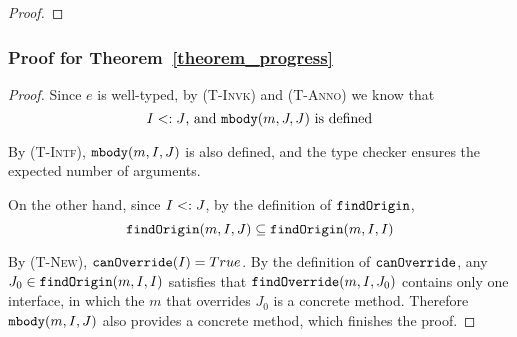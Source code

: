 \begin{proof}
\begin{comment}
\noindent \textbf{Case Super-Invk.}
let \[ e = \kwsuper.K::m(\overline{\angl{I_e}} \overline{e}) \]   
Suppose \[ \mbody(m, K, K) = (J', \overline{I_x} \; \overline{x}, I_{e_0} \; e_0) \] 
then \[ e' =  [\overline{\angl{I_x}} \overline{e}/\overline{x}] e_0 \] 
By rules \textsc{(T-New)} and \textsc{(T-Invk)}, 
  \[ 
     \mtype(m, K, K) = \overline{I_x} \rightarrow I_{e_0} \quad 
     \judgeewf \Gamma {\overline{e} : \overline{I_e'}} \quad
     \overline{I_e'} \subtype \overline{I_x} \quad
     \textit{, for some } \; \overline{I_e'}
  \]
By Lemma~\ref{lemma0},
    \[
    \judgeewf {\Gamma, \overline{x}:\overline{I_x}, \kwthis:J_0} {e_0:I_f} \textit{, for some } K \subtype J_0 \textit{ and } I_f \subtype I_{e_0}
    \]
By Lemma~\ref{lemma1},
    \[
    \judgeewf {\Gamma} {[\overline{\angl{I_x}} \overline{e}/\overline{x} ] e_0  :  I_g} \textit{, for some } I_g \subtype I_f 
    \]
So $I_g <: I_{e_0}$, finally just let $I' = I_g$.

\end{comment}
\end{proof}

\subsubsection{Proof for Theorem~\ref{theorem_progress}}
\begin{proof}
	
Since $e$ is well-typed, by \textsc{(T-Invk)} and \textsc{(T-Anno)} we know that
$$I <: J\textrm{, and }\texttt{mbody}(m, J, J) \textrm{ is defined}$$

By \textsc{(T-Intf)}, $\texttt{mbody}(m, I, J)$ is also defined, and the type checker ensures the expected number of arguments.

On the other hand, since $I <: J$, by the definition of $\texttt{findOrigin}$, $$\texttt{findOrigin}(m, I, J) \subseteq \texttt{findOrigin}(m, I, I)$$

By \textsc{(T-New)}, $\texttt{canOverride}(I) = True$. By the definition of $\texttt{canOverride}$, any $J_0\in\texttt{findOrigin}(m, I, I)$ satisfies that
$\texttt{findOverride}(m, I, J_0)$ contains only one interface, in which the $m$ that overrides $J_0$ is a concrete method. Therefore $\texttt{mbody}(m, I, J)$ also provides a concrete method, which finishes the proof.
\end{proof}